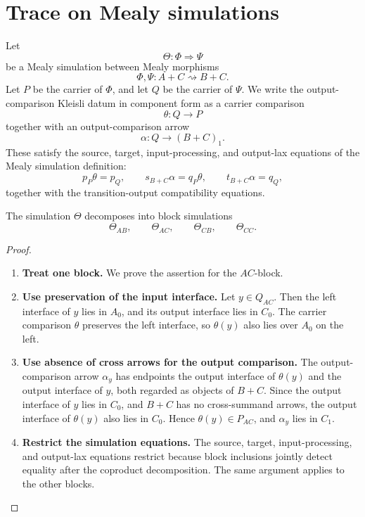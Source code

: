 \section{Trace on Mealy simulations}
\label{sec:trace-simulations-feedback}

Let
\[
  \Theta:\Phi\Rightarrow\Psi
\]
be a Mealy simulation between Mealy morphisms
\[
  \Phi,\Psi:A+C\rightsquigarrow B+C.
\]
Let \(P\) be the carrier of \(\Phi\), and let \(Q\) be the carrier of
\(\Psi\). We write the output-comparison Kleisli datum in component form as a
carrier comparison
\[
  \theta:Q\to P
\]
together with an output-comparison arrow
\[
  \alpha:Q\to (B+C)_1.
\]
These satisfy the source, target, input-processing, and output-lax equations
of the Mealy simulation definition:
\[
  p_P\theta=p_Q,
  \qquad
  s_{B+C}\alpha=q_P\theta,
  \qquad
  t_{B+C}\alpha=q_Q,
\]
together with the transition-output compatibility equations.

\begin{lemma}
\label{lem:simulation-block-restriction-feedback}
The simulation \(\Theta\) decomposes into block simulations
\[
  \Theta_{AB},
  \qquad
  \Theta_{AC},
  \qquad
  \Theta_{CB},
  \qquad
  \Theta_{CC}.
\]
\end{lemma}

\begin{proof}
\begin{enumerate}
  \item \textbf{Treat one block.}
  We prove the assertion for the \(AC\)-block.

  \item \textbf{Use preservation of the input interface.}
  Let \(y\in Q_{AC}\). Then the left interface of \(y\) lies in \(A_0\), and
  its output interface lies in \(C_0\). The carrier comparison \(\theta\)
  preserves the left interface, so \(\theta(y)\) also lies over \(A_0\) on
  the left.

  \item \textbf{Use absence of cross arrows for the output comparison.}
  The output-comparison arrow \(\alpha_y\) has endpoints the output interface
  of \(\theta(y)\) and the output interface of \(y\), both regarded as objects
  of \(B+C\). Since the output interface of \(y\) lies in \(C_0\), and \(B+C\)
  has no cross-summand arrows, the output interface of \(\theta(y)\) also
  lies in \(C_0\). Hence \(\theta(y)\in P_{AC}\), and \(\alpha_y\) lies in
  \(C_1\).

  \item \textbf{Restrict the simulation equations.}
  The source, target, input-processing, and output-lax equations restrict
  because block inclusions jointly detect equality after the coproduct
  decomposition. The same argument applies to the other blocks.
\end{enumerate}
\end{proof}

